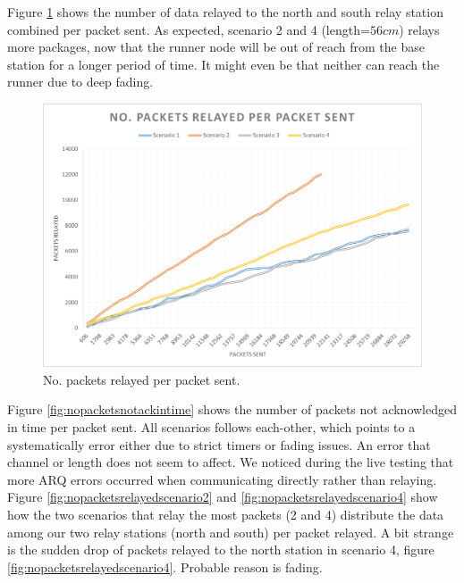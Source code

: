 \noindent Figure \ref{fig:nopacketsrelayed} shows the number of data relayed to the north  and south relay station combined per packet sent. As expected, scenario 2 and 4 (length=$56cm$) relays more packages, now that the runner node will be out of reach from the base station for a longer period of time. It might even be that neither can reach the runner due to deep fading.

\begin{figure}[h]
	\centering
	\includegraphics[width=1\linewidth]{results/NoPacketsRelayed}
	\caption{No. packets relayed per packet sent.}
	\label{fig:nopacketsrelayed}
\end{figure}

\noindent Figure \ref{fig:nopacketsnotackintime} shows the number of packets not acknowledged in time per packet sent. All scenarios follows each-other, which points to a systematically error either due to strict timers or fading issues. An error that channel or length does not seem to affect. We noticed during the live testing that more ARQ errors occurred when communicating directly rather than relaying. Figure \ref{fig:nopacketsrelayedscenario2} and \ref{fig:nopacketsrelayedscenario4} show how the two scenarios that relay the most packets (2 and 4) distribute the data among our two relay stations (north and south) per packet relayed. A bit strange is the sudden drop of packets relayed to the north station in scenario 4, figure  \ref{fig:nopacketsrelayedscenario4}. Probable reason is fading.

